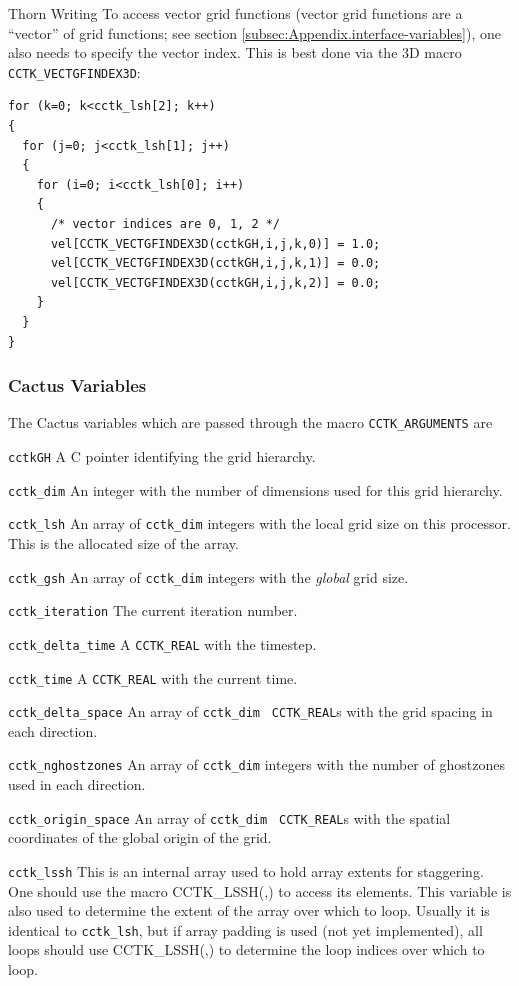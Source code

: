 \begin{cactuspart}{Thorn Writing}
To access vector grid functions (vector grid functions are a
``vector'' of grid functions; see section
\ref{subsec:Appendix.interface-variables}), one also needs to specify
the vector index. This is best done via the 3D macro
\texttt{CCTK\_VECTGFINDEX3D}:
\begin{verbatim}
for (k=0; k<cctk_lsh[2]; k++)
{
  for (j=0; j<cctk_lsh[1]; j++)
  {
    for (i=0; i<cctk_lsh[0]; i++)
    {
      /* vector indices are 0, 1, 2 */
      vel[CCTK_VECTGFINDEX3D(cctkGH,i,j,k,0)] = 1.0;
      vel[CCTK_VECTGFINDEX3D(cctkGH,i,j,k,1)] = 0.0;
      vel[CCTK_VECTGFINDEX3D(cctkGH,i,j,k,2)] = 0.0;
    }
  }
}
\end{verbatim}

\subsubsection{Cactus Variables}
\label{sec:cactus_variables_c}

The Cactus variables which are passed through the macro
\texttt{CCTK\_ARGUMENTS} are
\begin{Lentry}
\item [\texttt{cctkGH}] A C pointer identifying the grid hierarchy.
\item [\texttt{cctk\_dim}] An integer with the number of dimensions
      used for this grid hierarchy.
\item [\texttt{cctk\_lsh}] An array of \texttt{cctk\_dim} integers
      with the local grid size on this processor.  This is the allocated
      size of the array.
\item [\texttt{cctk\_gsh}] An array of \texttt{cctk\_dim} integers
      with the \textit{global} grid size.
\item [\texttt{cctk\_iteration}] The current iteration number.
\item [\texttt{cctk\_delta\_time}] A \texttt{CCTK\_REAL} with the timestep.
\item [\texttt{cctk\_time}] A \texttt{CCTK\_REAL} with the current time.
\item [\texttt{cctk\_delta\_space}] An array of \texttt{cctk\_dim} {\tt
CCTK\_REAL}s with the grid spacing in each direction.
\item [\texttt{cctk\_nghostzones}] An array of \texttt{cctk\_dim} integers with
         the number of ghostzones used in each direction.
\item [\texttt{cctk\_origin\_space}] An array of \texttt{cctk\_dim} {\tt
      CCTK\_REAL}s with the spatial coordinates of the global origin
      of the grid.
\item [\texttt{cctk\_lssh}]  This is an internal array used to hold
array extents for staggering.  One should use the macro CCTK\_LSSH(,)
to access its elements.  This variable is also used to determine the
extent of the array over which to loop.  Usually it is identical to
\texttt{cctk\_lsh}, but if array padding is used (not yet implemented), all
loops should use CCTK\_LSSH(,) to determine the loop indices over which to
loop.


\end{Lentry}
\end{cactuspart}
